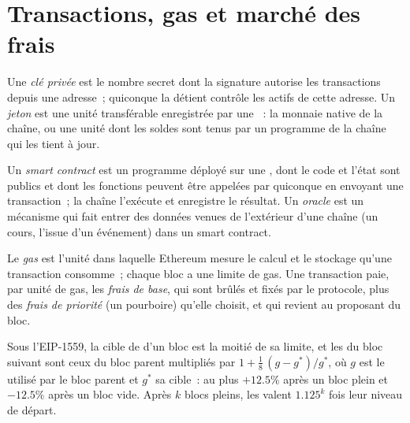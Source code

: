 \section{Transactions, gas et marché des frais}

\begin{definition}\label{def:m3:blockchains-for-traders:key}
Une \emph{clé privée} est le nombre secret dont la signature autorise les transactions depuis
une adresse~; quiconque la détient contrôle les actifs de cette adresse. Un \emph{jeton} est une
unité transférable enregistrée par une ~: la monnaie native de la chaîne, ou une unité dont les soldes sont tenus par un programme
de la chaîne qui les tient à jour.
\end{definition}

\begin{definition}\label{def:m3:blockchains-for-traders:contract}
Un \emph{smart contract} est un programme déployé sur une , dont le code et l'état
sont publics et dont les fonctions peuvent être appelées par quiconque en envoyant une transaction~; la chaîne l'exécute et enregistre
le résultat. Un \emph{oracle} est un mécanisme qui fait entrer des données venues de l'extérieur d'une chaîne (un cours,
l'issue d'un événement) dans un smart contract.
\end{definition}

\begin{definition}\label{def:m3:blockchains-for-traders:gas}
Le \emph{gas} est l'unité dans laquelle Ethereum mesure le calcul et le stockage qu'une transaction
consomme~; chaque bloc a une limite de gas. Une transaction paie, par unité de gas, les \emph{frais de
base}, qui sont brûlés et fixés par le protocole, plus des \emph{frais de priorité}
(un pourboire) qu'elle choisit, et qui revient au proposant du bloc.
\end{definition}

\begin{proposition}\label{prop:m3:blockchains-for-traders:basefee}
Sous l'EIP-1559, la cible de  d'un bloc est la moitié de sa limite, et les  du bloc suivant sont ceux du bloc parent
multipliés par $1 + \tfrac18\,(g - g^{*})/g^{*}$, où $g$ est le  utilisé par le bloc parent et $g^{*}$ sa cible~:
au plus $+12.5\%$ après un bloc plein et $-12.5\%$ après un bloc vide. Après $k$ blocs pleins, les  valent
$1.125^k$ fois leur niveau de départ.
\end{proposition}


